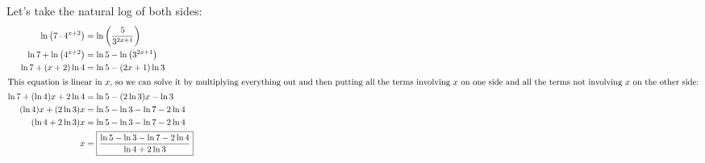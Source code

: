 \documentclass{article}
\begin{document}
\begin{enumerate}[resume]
\begin{enumerate}
    \begin{solution}
      Let's take the natural log of both sides:
      \begin{align*}
        \ln \left( 7 \cdot 4^{x + 2} \right) &= \ln \left(
          \frac{5}{3^{2x + 1}} \right) \\
        \ln 7 + \ln \left( 4^{x + 2} \right) &= \ln 5 - \ln \left( 3^{2x
            + 1} \right) \\
        \ln 7 + (x + 2) \ln 4 &= \ln 5 - (2x + 1) \ln 3 \\
        \intertext{This equation is linear in $x$, so we can solve it by multiplying everything out and then putting all the terms involving $x$ on one side and all the terms not involving $x$ on the other side:}
        \ln 7 + (\ln 4) x + 2 \ln 4 &= \ln 5 - (2 \ln 3) x - \ln 3 \\
        (\ln 4) x + (2 \ln 3) x &= \ln 5 - \ln 3 - \ln 7 - 2 \ln 4 \\
        (\ln 4 + 2 \ln 3) x &= \ln 5 - \ln 3 - \ln 7 - 2 \ln 4 \\
        x &= \boxed{\frac{\ln 5 - \ln 3 - \ln 7 - 2 \ln 4}{\ln 4 + 2 \ln 3}}
      \end{align*}
    \end{solution}

  \end{enumerate}    

\end{enumerate}
\end{document}
